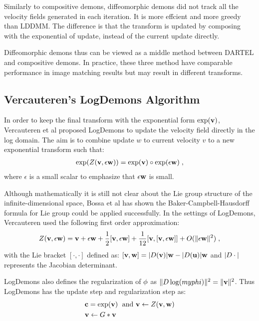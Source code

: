 \documentclass[letterpaper,12pt]{article}
\begin{document}
Similarly to compositive demons, diffeomorphic demons did not track all the velocity fields generated in each iteration. It is more effcient and more greedy than LDDMM. The difference is that the transform is updated by composing with the exponential of update, instead of the current update directly. 

Diffeomorphic demons thus can be viewed as a middle method between DARTEL and compositive demons. In practice, these three method have comparable performance \cite{Hernandez2008b,Vercauteren2009} in image matching results but may result in different transforms.


\subsection{Vercauteren's LogDemons Algorithm}

In order to keep the final transform with the exponential form $\exp(\mathbf{v})$, Vercauteren et al proposed LogDemons \cite{Vercauteren2008Symmetric} to update the velocity field directly in the log domain. The aim is to combine update $w$ to current velocity $v$ to a new exponential transform such that:
\begin{align}
\exp(Z(\mathbf{v}, \epsilon \mathbf{w})) = \exp(\mathbf{v}) \circ \exp(\epsilon \mathbf{w}) \;,
\end{align}
where $\epsilon$ is a small scalar to emphasize that $\epsilon \mathbf{w}$ is small. 

Although mathematically it is still not clear about the Lie group structure of the infinite-dimensional space, Bossa et al has shown the Baker-Campbell-Hausdorff formula for Lie group could be applied successfully. In the settings of LogDemons, Vercauteren used the following first order approximation:
\begin{align}
Z(\mathbf{v}, \epsilon \mathbf{w}) = \mathbf{v} + \epsilon \mathbf{w} + \frac{1}{2}[\mathbf{v}, \epsilon\mathbf{w}]+\frac{1}{12}[\mathbf{v},[\mathbf{v},\epsilon\mathbf{w}]] + O(\|\epsilon\mathbf{w}\|^2) \;, 
\end{align}
with the Lie bracket $[\cdot,\cdot]$ defined as: 
$
[\mathbf{v},\mathbf{w}]=|D(\mathbf{v})|\mathbf{w}-|D(\mathbf{u})|\mathbf{w}
$
and $|D\cdot|$ represents the Jacobian determinant.

LogDemons also defines the regularization of $\phi$ as $\| D \log(myphi) \|^2=\|\mathbf{v}\|^2$. Thus LogDemons has the update step and regularization step as:
\begin{align}
 & \mathbf{c} = \exp(\mathbf{v}) \;\text{ and } \mathbf{v} \leftarrow Z(\mathbf{v}, \mathbf{w}) \\
 & \mathbf{v} \leftarrow {G} \ast \mathbf{v}
\end{align}
\end{document}
